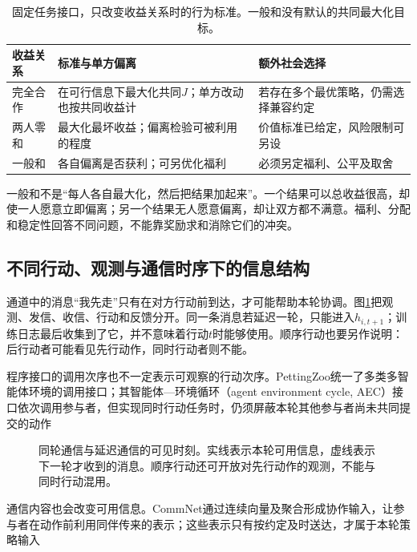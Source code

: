 \begin{table}[htbp]
 \centering
 \begin{tabularx}{\linewidth}{@{}l >{\raggedright\arraybackslash}X >{\raggedright\arraybackslash}X@{}}
 \toprule
 收益关系 & 标准与单方偏离 & 额外社会选择\\
 \midrule
 完全合作 & 在可行信息下最大化共同$J$；单方改动也按共同收益计 & 若存在多个最优策略，仍需选择兼容约定\\
 两人零和 & 最大化最坏收益；偏离检验可被利用的程度 & 价值标准已给定，风险限制可另设\\
 一般和 & 各自偏离是否获利；可另优化福利 & 必须另定福利、公平及取舍\\
 \bottomrule
 \end{tabularx}
 \caption{固定任务接口，只改变收益关系时的行为标准。一般和没有默认的共同最大化目标。}
 \label{tab:rl-multi-agent-payoffs}
\end{table}

一般和不是“每人各自最大化，然后把结果加起来”。一个结果可以总收益很高，却使一人愿意立即偏离；另一个结果无人愿意偏离，却让双方都不满意。福利、分配和稳定性回答不同问题，不能靠奖励求和消除它们的冲突。

\subsection{不同行动、观测与通信时序下的信息结构}
\label{sec:rl-multi-agent-information}

通道中的消息“我先走”只有在对方行动前到达，才可能帮助本轮协调。图\ref{fig:rl-multi-agent-timing}把观测、发信、收信、行动和反馈分开。同一条消息若延迟一轮，只能进入$h_{i,t+1}$；训练日志最后收集到了它，并不意味着行动$t$时能够使用。顺序行动也要另作说明：后行动者可能看见先行动作，同时行动者则不能。

程序接口的调用次序也不一定表示可观察的行动次序。PettingZoo统一了多类多智能体环境的调用接口；其智能体—环境循环（agent environment cycle, AEC）接口依次调用参与者，但实现同时行动任务时，仍须屏蔽本轮其他参与者尚未共同提交的动作

\begin{figure}[htbp]
 \centering
 
 \caption{同轮通信与延迟通信的可见时刻。实线表示本轮可用信息，虚线表示下一轮才收到的消息。顺序行动还可开放对先行动作的观测，不能与同时行动混用。}
 \label{fig:rl-multi-agent-timing}
\end{figure}

通信内容也会改变可用信息。CommNet通过连续向量及聚合形成协作输入，让参与者在动作前利用同伴传来的表示；这些表示只有按约定及时送达，才属于本轮策略输入

